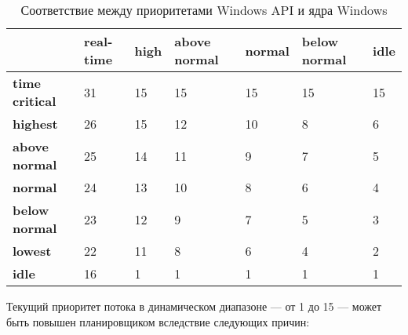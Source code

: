\begin{table}[h]
    \caption{Соответствие между приоритетами Windows API и ядра Windows}
    \begin{center}
        \begin{tabular}{|l|p{45pt}|p{45pt}|p{45pt}|p{45pt}|p{45pt}|p{45pt}|}
            \hline
            {} & \textbf{real-time} & \textbf{high} & \textbf{above normal} & \textbf{normal} & \textbf{below normal} & \textbf{idle}\\
            \hline
            \textbf{time critical} & 31 & 15 & 15 & 15 & 15 & 15 \\
            \hline
            \textbf{highest} & 26 & 15 & 12 & 10 & 8 & 6 \\
            \hline
            \textbf{above normal} & 25 & 14 & 11 & 9 & 7 & 5 \\
            \hline
            \textbf{normal} & 24 & 13 & 10 & 8 & 6 & 4 \\
            \hline
            \textbf{below normal} & 23 & 12 & 9 & 7 & 5 & 3 \\
            \hline
            \textbf{lowest} & 22 & 11 & 8 & 6 & 4 & 2 \\
            \hline
            \textbf{idle} & 16 & 1 & 1 & 1 & 1 & 1 \\
            \hline
        \end{tabular}
    \end{center}
    \label{tbl:priority}
\end{table}


Текущий приоритет потока в динамическом диапазоне --- от 1 до 15 --- может быть повышен планировщиком вследствие следующих причин:

